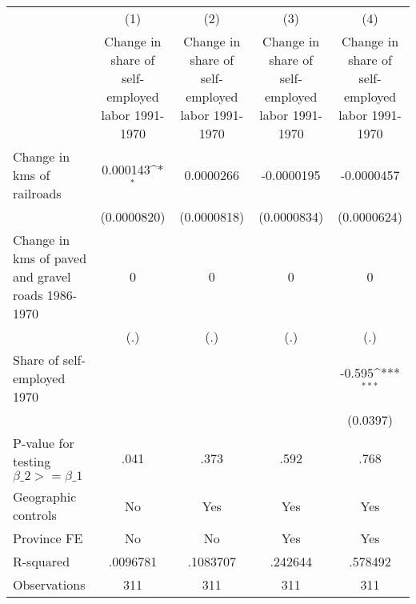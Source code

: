 {
\def\sym#1{\ifmmode^{#1}\else\(^{#1}\)\fi}
\begin{tabular}{l*{4}{c}}
\hline\hline
                &\multicolumn{1}{c}{(1)}&\multicolumn{1}{c}{(2)}&\multicolumn{1}{c}{(3)}&\multicolumn{1}{c}{(4)}\\
                &\multicolumn{1}{c}{Change in share of self-employed labor 1991-1970}&\multicolumn{1}{c}{Change in share of self-employed labor 1991-1970}&\multicolumn{1}{c}{Change in share of self-employed labor 1991-1970}&\multicolumn{1}{c}{Change in share of self-employed labor 1991-1970}\\
\hline
Change in kms of railroads& 0.000143\sym{*}  &0.0000266         &-0.0000195         &-0.0000457         \\
                &(0.0000820)         &(0.0000818)         &(0.0000834)         &(0.0000624)         \\
[1em]
Change in kms of paved and gravel roads 1986-1970&        0         &        0         &        0         &        0         \\
                &      (.)         &      (.)         &      (.)         &      (.)         \\
[1em]
Share of self-employed 1970&                  &                  &                  &   -0.595\sym{***}\\
                &                  &                  &                  & (0.0397)         \\
\hline
P-value for testing $\beta\_{2} >= \beta\_{1}$&     .041         &     .373         &     .592         &     .768         \\
Geographic controls&       No         &      Yes         &      Yes         &      Yes         \\
Province FE     &       No         &       No         &      Yes         &      Yes         \\
R-squared       & .0096781         & .1083707         &  .242644         &  .578492         \\
Observations    &      311         &      311         &      311         &      311         \\
\hline\hline
\end{tabular}
}

